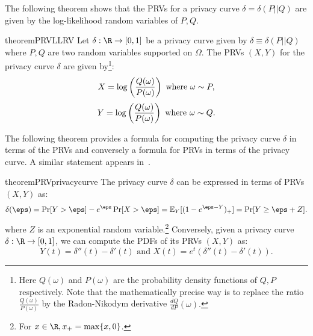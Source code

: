 The following theorem shows that the PRVs for a privacy curve $\delta=\delta(P||Q)$ are given by the log-likelihood random variables of $P,Q.$ 
\begin{restatable}{theorem}{PRVLLRV}
\label{thm:PRV_LLRV}
 Let $\delta:\R \to [0,1]$ be a privacy curve given by $\delta \equiv \delta(P||Q)$ where $P,Q$ are two random variables supported on $\Omega$. The PRVs $(X,Y)$ for the privacy curve $\delta$ are given by\footnote{Here $Q(\omega)$ and $P(\omega)$ are the probability density functions of $Q,P$ respectively. Note that the mathematically precise way is to replace the ratio $\frac{Q(\omega)}{P(\omega)}$ by the Radon-Nikodym derivative $\frac{dQ}{dP}(\omega).$}:
 $$X = \log\left( \frac{Q(\omega)}{P(\omega)}\right) \text{ where } \omega \sim P,$$
 $$Y = \log\left( \frac{Q(\omega)}{P(\omega)}\right) \text{ where } \omega \sim Q.$$
\end{restatable}

The following theorem provides a formula for computing the privacy curve $\delta$ in terms of the PRVs and conversely a formula for PRVs in terms of the privacy curve. A similar statement appears in~\cite{sommer2019privacy,koskela2020computing}.

\begin{restatable}{theorem}{PRVprivacycurve}
\label{thm:PRV_privacycurve}
 The privacy curve $\delta$ can be expressed in terms of PRVs $(X,Y)$ as:
 \begin{equation}
 \label{eqn:delta_PRV_simple}
 \delta(\eps)=\Pr[Y> \eps] - e^\eps \Pr[X > \eps]=\E_Y[(1-e^{\eps-Y})_+] =\Pr[Y\ge \eps+Z].
 \end{equation}
 where $Z$ is an exponential random variable.\footnote{For $x\in \R, x_+=\max\{x,0\}$.} Conversely, given a privacy curve $\delta:\R\to [0,1]$, we can compute the PDFs of its PRVs $(X,Y)$ as:
 \begin{equation}
 \label{eqn:PRV_from_delta}
 Y(t) = \delta''(t)-\delta'(t) \text{ and } X(t)=e^t(\delta''(t)-\delta'(t)).
 \end{equation}
\end{restatable}

